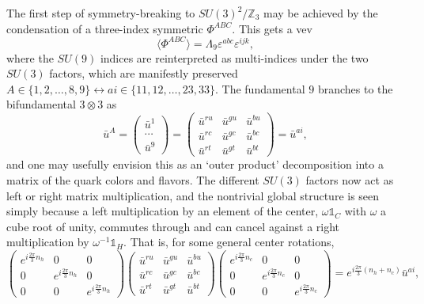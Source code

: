 \documentclass[11pt,a4paper]{article}
\begin{document}
The first step of symmetry-breaking to $SU(3)^2/\mathbb{Z}_3$ may be achieved by the condensation of a three-index symmetric $\Phi^{ABC}$.
This gets a vev 
\begin{equation}
\langle \Phi^{ABC} \rangle = \Lambda_9 \varepsilon^{abc} \varepsilon^{ijk}, 
\end{equation}
where the $SU(9)$ indices are reinterpreted as multi-indices under the two $SU(3)$ factors, which are manifestly preserved $A\in \lbrace 1,2,\dots,8,9\rbrace \leftrightarrow ai\in\lbrace 11,12,\dots,23,33 \rbrace$. 
The fundamental $9$ branches to the bifundamental $3 \otimes 3$ as
\begin{equation}
    \bar u^A = \begin{pmatrix} \bar u^1 \\ \cdots \\ \bar u^9 \end{pmatrix} = \begin{pmatrix}
        \bar u^{ru} & \bar u^{gu} & \bar u^{bu} \\
        \bar u^{rc} & \bar u^{gc} & \bar u^{bc} \\
        \bar u^{rt} & \bar u^{gt} & \bar u^{bt} 
    \end{pmatrix} = \bar u^{ai},
\end{equation}
and one may usefully envision this as an `outer product' decomposition into a matrix of the quark colors and flavors. 
The different $SU(3)$ factors now act as left or right matrix multiplication, and the nontrivial global structure is seen simply because a left multiplication by an element of the center, $\omega \mathds{1}_C$ with $\omega$ a cube root of unity, commutes through and can cancel against a right multiplication by $\omega^{-1} \mathds{1}_H$. That is, for some general center rotations,
\begin{equation}
    \begin{pmatrix}
    e^{i\frac{2\pi}{3} n_h} & 0 & 0 \\ 
    0 & e^{i\frac{2\pi}{3} n_h} & 0 \\
    0 & 0 & e^{i\frac{2\pi}{3} n_h}
    \end{pmatrix}
    \begin{pmatrix}
        \bar u^{ru} & \bar u^{gu} & \bar u^{bu} \\
        \bar u^{rc} & \bar u^{gc} & \bar u^{bc} \\
        \bar u^{rt} & \bar u^{gt} & \bar u^{bt} 
    \end{pmatrix}
    \begin{pmatrix}
    e^{i\frac{2\pi}{3} n_c} & 0 & 0 \\ 
    0 & e^{i\frac{2\pi}{3} n_c} & 0 \\
    0 & 0 & e^{i\frac{2\pi}{3} n_c}
    \end{pmatrix} = e^{i \frac{2\pi}{3}(n_h + n_c)} \bar u^{ai}, 
\end{equation}
\end{document}

